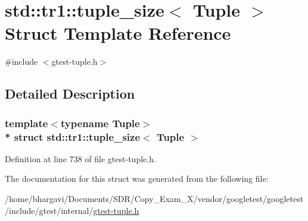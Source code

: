 \hypertarget{structstd_1_1tr1_1_1tuple__size}{}\section{std\+:\+:tr1\+:\+:tuple\+\_\+size$<$ Tuple $>$ Struct Template Reference}
\label{structstd_1_1tr1_1_1tuple__size}


{\ttfamily \#include $<$gtest-\/tuple.\+h$>$}



\subsection{Detailed Description}
\subsubsection*{template$<$typename Tuple$>$\\*
struct std\+::tr1\+::tuple\+\_\+size$<$ Tuple $>$}



Definition at line 738 of file gtest-\/tuple.\+h.



The documentation for this struct was generated from the following file\+:\begin{DoxyCompactItemize}
\item 
/home/bhargavi/\+Documents/\+S\+D\+R/\+Copy\+\_\+\+Exam\+\_\+X/vendor/googletest/googletest/include/gtest/internal/\hyperlink{gtest-tuple_8h}{gtest-\/tuple.\+h}\end{DoxyCompactItemize}
